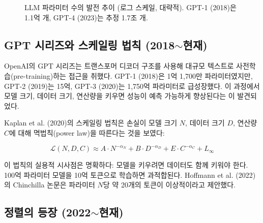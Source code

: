 \begin{figure}[htbp]
\centering
{}
\caption{LLM 파라미터 수의 발전 추이 (로그 스케일, 대략적). GPT-1 (2018)은 1.1억 개, GPT-4 (2023)는 추정 1.7조 개.}
\label{fig:llm-scaling}
\end{figure}

\subsection{GPT 시리즈와 스케일링 법칙 (2018$\sim$현재)}

OpenAI의 GPT 시리즈는 트랜스포머 디코더 구조를 사용해 대규모 텍스트로 사전학습(pre-training)하는 접근을 취했다. GPT-1 (2018)은 1억 1,700만 파라미터였지만, GPT-2 (2019)는 15억, GPT-3 (2020)는 1,750억 파라미터로 급성장했다. 이 과정에서 모델 크기, 데이터 크기, 연산량을 키우면 성능이 예측 가능하게 향상된다는 이 발견되었다.

Kaplan et al. (2020)의 스케일링 법칙은 손실이 모델 크기 $N$, 데이터 크기 $D$, 연산량 $C$에 대해 멱법칙(power law)을 따른다는 것을 보였다:

\[
\mathcal{L}(N, D, C) \approx A \cdot N^{-\alpha_N} + B \cdot D^{-\alpha_D} + E \cdot C^{-\alpha_C} + L_\infty
\]

이 법칙의 실용적 시사점은 명확하다: 모델을 키우려면 데이터도 함께 키워야 한다. 100억 파라미터 모델을 10억 토큰으로 학습하면 과적합된다. Hoffmann et al. (2022)의 Chinchilla 논문은 파라미터 $N$당 약 20개의 토큰이 이상적이라고 제안했다.

\subsection{정렬의 등장 (2022$\sim$현재)}

